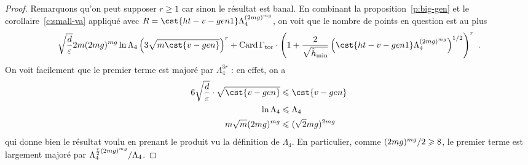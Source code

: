 \begin{proof}
  Remarquons qu'on peut supposer \( r \ge 1 \) car sinon le résultat est
  banal.  En combinant la proposition~\vref{p:big-gen} et le
  corollaire~\vref{c:small-va} appliqué avec \( R = \cst{ht-v-gen1}
    \Lambda_4^{(2\puiss\genre)^{\puiss\genre}} \), on voit que le nombre de
  points en question est au plus
  \begin{equation}
    \sqrt{\frac d \expapx}
    2 \puiss
    (2\puiss\genre)^{\puiss\genre}
    \ln \Lambda_4
    \left( 3 \sqrt{ \puiss \cst{v-gen} } \right)^r
    +
    \card \Gamma_\torsion
    \cdot
    \left( 1 + \frac2{\sqrt{\hmin}}
      \left(
        \cst{ht-v-gen1} \Lambda_4^{(2\puiss\genre)^{\puiss\genre}}
      \right)^{1/2}
    \right)^r
    \pmm.
  \end{equation}
  On voit facilement que le premier terme est majoré par \( \Lambda_4^{3r} \)
  : en effet, on a
  \begin{align}
    6 \sqrt{\frac d \expapx}
    \cdot \sqrt{ \cst{v-gen} }
    & \le
    \cst{v-gen}
    \\
    \ln \Lambda_4
    & \le
    \Lambda_4
    \\
    \puiss \sqrt\puiss
    (2\puiss\genre)^{\puiss\genre}
    & \le
    (\sqrt2 \puiss \genre)^{2\puiss\genre}
  \end{align}
  qui donne bien le résultat voulu en prenant le produit vu la définition de
  \( \Lambda_4 \). En particulier, comme \( (2mg)^{mg} /
    2 \geqslant 8 \), le premier terme est largement majoré par \( \Lambda_4^{ \frac
      r2 (2mg)^{mg} } / \Lambda_4 \).


\end{proof}
